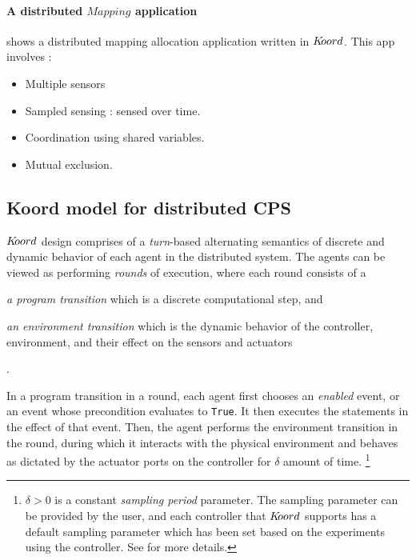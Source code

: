 \paragraph* {A distributed $\mathit{Mapping}$  application}  shows a distributed mapping allocation application written in $K\kern-2pt oord$. This app involves :
\begin{itemize}
    \item Multiple sensors
    \item Sampled sensing : sensed over time. 
    \item Coordination using shared variables. 
    \item Mutual exclusion. 
\end{itemize}

\subsection{Koord model for distributed CPS}


$K\kern-2pt oord$ design comprises of a \emph{turn}-based alternating semantics of discrete and dynamic behavior of each agent in the distributed system. The agents can be viewed as performing \emph{rounds} of execution, where each round consists of a \begin{inparaenum} 
\item \emph{a program transition} which is a discrete computational step, and 
\item \item \emph{an environment transition} which is the dynamic behavior of the controller, environment, and their effect on the sensors and actuators
\end{inparaenum}. 

In a program transition in a round, each agent first  chooses an \emph{enabled} event, or an event whose precondition evaluates to \verb|True|. It then executes the statements in the effect of that event. %
Then, the agent performs the environment transition in the round, during which it interacts with the physical environment and behaves as dictated by the actuator ports on the controller for $\delta$ amount of time.  \footnote{ $\delta>0$ is a constant \emph{sampling period} parameter. The sampling parameter can be provided by the user, and each controller that $K\kern-2pt oord$ supports has a default sampling parameter which has been set based on the experiments using the controller. See  for more details.}  %

